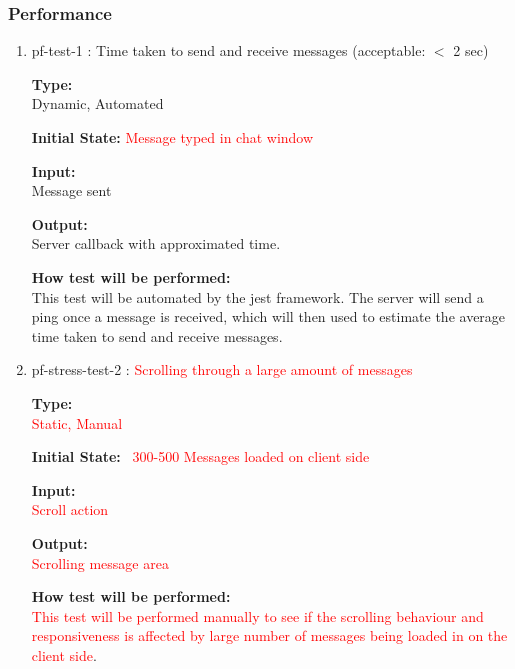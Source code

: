 \documentclass[12pt, titlepage]{article}
\begin{document}
\subsubsection{Performance}
\label{sec:perf}
\begin{enumerate}
\item{pf-test-1 : Time taken to send and receive messages (acceptable: $<$ 2 sec)\\}

\textbf{Type:}\\ Dynamic, Automated
					
\textbf{Initial State:} \textcolor{red}{Message typed in chat window}
					
\textbf{Input:}\\ Message sent
					
\textbf{Output:}\\ Server callback with approximated time.
					
\textbf{How test will be performed:}\\ 
This test will be automated by the jest framework. The server will send a ping once a message is received, which will then used to estimate the average time taken to send and receive messages.\\

\item{pf-stress-test-2 : \textcolor{red}{ Scrolling through a large amount of messages\\}}

\textbf{Type:}\\ \textcolor{red}{Static, Manual}
					
\textbf{Initial State:} \textcolor{red}{~300-500 Messages loaded on client side}
					
\textbf{Input:}\\ \textcolor{red}{ Scroll action}
					
\textbf{Output:}\\ \textcolor{red}{Scrolling message area}
					
\textbf{How test will be performed:}\\ 
\textcolor{red}{ This test will be performed manually to see if the scrolling behaviour and responsiveness is affected by large number of messages being loaded in on the client side}.
\end{enumerate}
\end{document}
